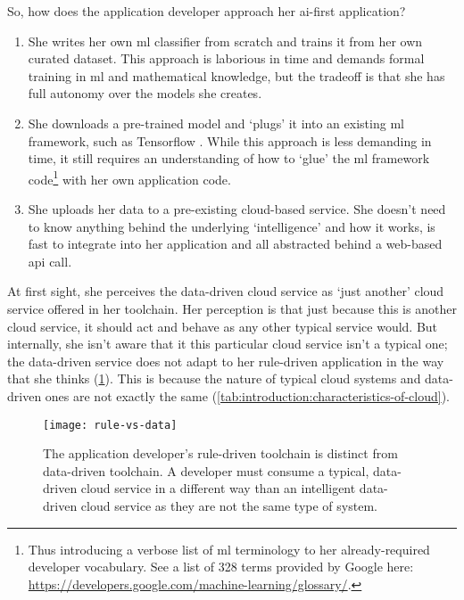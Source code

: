 So, how does the application developer approach her \gls{ai}-first application? 

\begin{enumerate}
  \item She writes her own \gls{ml} classifier from scratch and trains it from her own curated dataset. This approach is laborious in time and demands formal training in \gls{ml} and mathematical knowledge, but the tradeoff is that she has full autonomy over the models she creates.
  \item She downloads a pre-trained model and `plugs' it into an existing \gls{ml} framework, such as Tensorflow \citep{Tensorflow:Whitepaper}. While this approach is less demanding in time, it still requires an understanding of how to `glue' the \gls{ml} framework code\footnote{Thus introducing a verbose list of \gls{ml} terminology to her already-required developer vocabulary. See a list of 328 terms provided by Google here: \url{https://developers.google.com/machine-learning/glossary/}.} with her own application code.
  \item She uploads her data to a pre-existing cloud-based service. She doesn't need to know anything behind the underlying `intelligence' and how it works, is fast to integrate into her application and all abstracted behind a web-based \gls{api} call.
\end{enumerate}

\noindent
At first sight, she perceives the data-driven cloud service as `just another' cloud service  offered in her toolchain. Her perception is that just because this is another cloud service, it should act and behave as any other typical service would. But internally, she isn't aware that it this particular cloud service isn't a typical one; the data-driven service does not adapt to her rule-driven application in the way that she thinks (\cref{fig:introduction:rule-vs-data}). This is because the nature of typical cloud systems and data-driven ones are not exactly the same (\cref{tab:introduction:characteristics-of-cloud}).

\begin{figure}[h!]
\centering
\caption[Data-driven cloud services are not the same as rule-driven ones]{The application developer's rule-driven toolchain is distinct from data-driven toolchain. A developer must consume a typical, data-driven cloud service in a different way than an intelligent data-driven cloud service as they are not the same type of system.}
\label{fig:introduction:rule-vs-data}
\texttt{[image: rule-vs-data]}
\end{figure}

